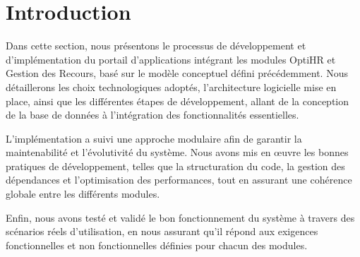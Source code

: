 \section{Introduction}
Dans cette section, nous présentons le processus de développement et d'implémentation du portail d'applications intégrant les modules OptiHR et Gestion des Recours, basé sur le modèle conceptuel défini précédemment. Nous détaillerons les choix technologiques adoptés, l'architecture logicielle mise en place, ainsi que les différentes étapes de développement, allant de la conception de la base de données à l'intégration des fonctionnalités essentielles.

L'implémentation a suivi une approche modulaire afin de garantir la maintenabilité et l'évolutivité du système. Nous avons mis en œuvre les bonnes pratiques de développement, telles que la structuration du code, la gestion des dépendances et l'optimisation des performances, tout en assurant une cohérence globale entre les différents modules.

Enfin, nous avons testé et validé le bon fonctionnement du système à travers des scénarios réels d'utilisation, en nous assurant qu'il répond aux exigences fonctionnelles et non fonctionnelles définies pour chacun des modules.
